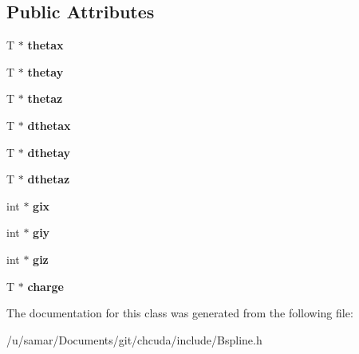 \subsection*{Public Attributes}
\begin{DoxyCompactItemize}
\item 
\hypertarget{classBspline_a0335fe4b5ef40fec3cde8bf053df310b}{}\label{classBspline_a0335fe4b5ef40fec3cde8bf053df310b} 
T $\ast$ {\bfseries thetax}
\item 
\hypertarget{classBspline_a797ff566b9f78f48bcf0a3eac52bd54a}{}\label{classBspline_a797ff566b9f78f48bcf0a3eac52bd54a} 
T $\ast$ {\bfseries thetay}
\item 
\hypertarget{classBspline_acea2e27d5e5227a8b32255f3176ca401}{}\label{classBspline_acea2e27d5e5227a8b32255f3176ca401} 
T $\ast$ {\bfseries thetaz}
\item 
\hypertarget{classBspline_aad85d4dc1b9072071e92b55f3fca9007}{}\label{classBspline_aad85d4dc1b9072071e92b55f3fca9007} 
T $\ast$ {\bfseries dthetax}
\item 
\hypertarget{classBspline_a60816bde76f2f515164908a868dfbd9a}{}\label{classBspline_a60816bde76f2f515164908a868dfbd9a} 
T $\ast$ {\bfseries dthetay}
\item 
\hypertarget{classBspline_a96d814a15beded714c6bf97316b6cc55}{}\label{classBspline_a96d814a15beded714c6bf97316b6cc55} 
T $\ast$ {\bfseries dthetaz}
\item 
\hypertarget{classBspline_ae596ebc2b8d2c25d4ab36660f48ba14c}{}\label{classBspline_ae596ebc2b8d2c25d4ab36660f48ba14c} 
int $\ast$ {\bfseries gix}
\item 
\hypertarget{classBspline_af0e14d459ce48fbee106123e5cc31c50}{}\label{classBspline_af0e14d459ce48fbee106123e5cc31c50} 
int $\ast$ {\bfseries giy}
\item 
\hypertarget{classBspline_a020d909fb452187ac9c1f06541902243}{}\label{classBspline_a020d909fb452187ac9c1f06541902243} 
int $\ast$ {\bfseries giz}
\item 
\hypertarget{classBspline_a16412a3fc067ee981e4f171c77e5cb1b}{}\label{classBspline_a16412a3fc067ee981e4f171c77e5cb1b} 
T $\ast$ {\bfseries charge}
\end{DoxyCompactItemize}


The documentation for this class was generated from the following file\+:\begin{DoxyCompactItemize}
\item 
/u/samar/\+Documents/git/chcuda/include/Bspline.\+h\end{DoxyCompactItemize}
